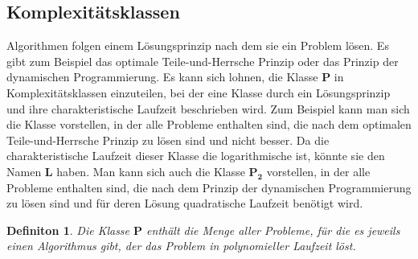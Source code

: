 \documentclass{scrartcl}
\newtheorem{definition}{Definiton}[section]
\numberwithin{equation}{section}
\begin{document}
\subsection{Komplexitätsklassen}
Algorithmen folgen einem Lösungsprinzip nach dem sie ein Problem lösen. Es gibt zum Beispiel das optimale Teile-und-Herrsche Prinzip oder das Prinzip der dynamischen Programmierung. Es kann sich lohnen, die Klasse $\mathbf{P}$ in Komplexitätsklassen einzuteilen, bei der eine Klasse durch ein Lösungsprinzip und ihre charakteristische Laufzeit beschrieben wird. Zum Beispiel kann man sich die Klasse vorstellen, in der alle Probleme enthalten sind, die nach dem optimalen Teile-und-Herrsche Prinzip zu lösen sind und nicht besser. Da die charakteristische Laufzeit dieser Klasse die logarithmische ist, könnte sie den Namen $\mathbf{L}$ haben. Man kann sich auch die Klasse $\mathbf{P_2}$ vorstellen, in der alle Probleme enthalten sind, die nach dem Prinzip der dynamischen Programmierung zu lösen sind und für deren Lösung quadratische Laufzeit benötigt wird.

\begin{definition}
	Die Klasse $\mathbf{P}$ enthält die Menge aller Probleme, für die es jeweils einen Algorithmus gibt, der das Problem in polynomieller Laufzeit löst.	
\end{definition}
\end{document}
